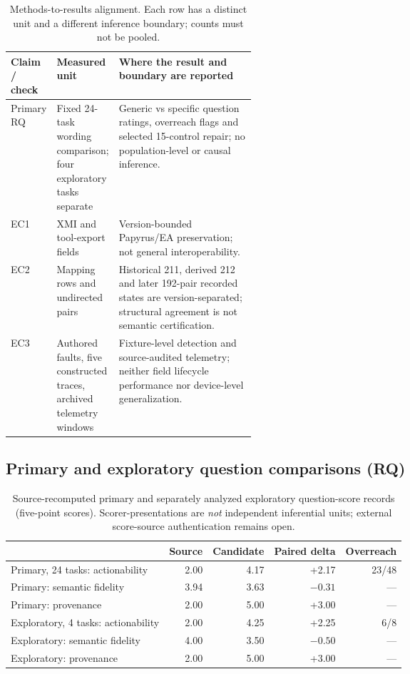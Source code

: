 \documentclass[12pt,a4paper]{article}
\begin{document}
\begin{table}[tbp]\centering\footnotesize
\caption{Methods-to-results alignment. Each row has a distinct unit and a different inference boundary; counts must not be pooled.}\label{tab:results-route}
\begin{tabularx}{\linewidth}{@{}p{0.18\linewidth}p{0.22\linewidth}Y@{}}\toprule
Claim / check & Measured unit & Where the result and boundary are reported \\\midrule
Primary RQ & Fixed 24-task wording comparison; four exploratory tasks separate & Generic vs specific question ratings, overreach flags and selected 15-control repair; no population-level or causal inference. \\
EC1 & XMI and tool-export fields & Version-bounded Papyrus/EA preservation; not general interoperability. \\
EC2 & Mapping rows and undirected pairs & Historical 211, derived 212 and later 192-pair recorded states are version-separated; structural agreement is not semantic certification. \\
EC3 & Authored faults, five constructed traces, archived telemetry windows & Fixture-level detection and source-audited telemetry; neither field lifecycle performance nor device-level generalization. \\
\bottomrule\end{tabularx}
\end{table}

\subsection{Primary and exploratory question comparisons (RQ)}
\begin{table}[tbp]\centering\small
\caption{Source-recomputed primary and separately analyzed exploratory question-score records (five-point scores). Scorer-presentations are \emph{not} independent inferential units; external score-source authentication remains open.}\label{tab:expert}
\begin{tabular}{@{}p{4.2cm}rrrr@{}}\toprule
& Source & Candidate & Paired delta & Overreach \\\midrule
Primary, 24 tasks: actionability & 2.00 & 4.17 & +2.17 & 23/48 \\
Primary: semantic fidelity & 3.94 & 3.63 & $-0.31$ & --- \\
Primary: provenance & 2.00 & 5.00 & +3.00 & --- \\
Exploratory, 4 tasks: actionability & 2.00 & 4.25 & +2.25 & 6/8 \\
Exploratory: semantic fidelity & 4.00 & 3.50 & $-0.50$ & --- \\
Exploratory: provenance & 2.00 & 5.00 & +3.00 & --- \\
\bottomrule\end{tabular}\end{table}
\end{document}
